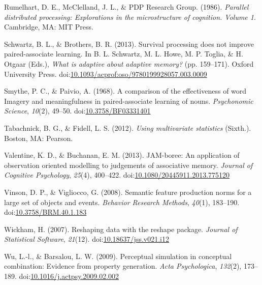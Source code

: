 \documentclass[english,,man]{apa6}
\begin{document}
\leavevmode\hypertarget{ref-Rumelhart1986}{}%
Rumelhart, D. E., McClelland, J. L., \& PDP Research Group. (1986). \emph{Parallel distributed processing: Explorations in the microstructure of cognition. Volume 1}. Cambridge, MA: MIT Press.

\leavevmode\hypertarget{ref-Schwartz2013}{}%
Schwartz, B. L., \& Brothers, B. R. (2013). Survival processing does not improve paired-associate learning. In B. L. Schwartz, M. L. Howe, M. P. Toglia, \& H. Otgaar (Eds.), \emph{What is adaptive about adaptive memory?} (pp. 159--171). Oxford University Press. doi:\href{https://doi.org/10.1093/acprof:oso/9780199928057.003.0009}{10.1093/acprof:oso/9780199928057.003.0009}

\leavevmode\hypertarget{ref-Smythe1968}{}%
Smythe, P. C., \& Paivio, A. (1968). A comparison of the effectiveness of word Imagery and meaningfulness in paired-associate learning of nouns. \emph{Psychonomic Science}, \emph{10}(2), 49--50. doi:\href{https://doi.org/10.3758/BF03331401}{10.3758/BF03331401}

\leavevmode\hypertarget{ref-Tabachnick2012}{}%
Tabachnick, B. G., \& Fidell, L. S. (2012). \emph{Using multivariate statistics} (Sixth.). Boston, MA: Pearson.

\leavevmode\hypertarget{ref-Valentine2013}{}%
Valentine, K. D., \& Buchanan, E. M. (2013). JAM-boree: An application of observation oriented modelling to judgements of associative memory. \emph{Journal of Cognitive Psychology}, \emph{25}(4), 400--422. doi:\href{https://doi.org/10.1080/20445911.2013.775120}{10.1080/20445911.2013.775120}

\leavevmode\hypertarget{ref-Vinson2008}{}%
Vinson, D. P., \& Vigliocco, G. (2008). Semantic feature production norms for a large set of objects and events. \emph{Behavior Research Methods}, \emph{40}(1), 183--190. doi:\href{https://doi.org/10.3758/BRM.40.1.183}{10.3758/BRM.40.1.183}

\leavevmode\hypertarget{ref-Wickham2007}{}%
Wickham, H. (2007). Reshaping data with the reshape package. \emph{Journal of Statistical Software}, \emph{21}(12). doi:\href{https://doi.org/10.18637/jss.v021.i12}{10.18637/jss.v021.i12}

\leavevmode\hypertarget{ref-Wu2009}{}%
Wu, L.-l., \& Barsalou, L. W. (2009). Perceptual simulation in conceptual combination: Evidence from property generation. \emph{Acta Psychologica}, \emph{132}(2), 173--189. doi:\href{https://doi.org/10.1016/j.actpsy.2009.02.002}{10.1016/j.actpsy.2009.02.002}
\end{document}
